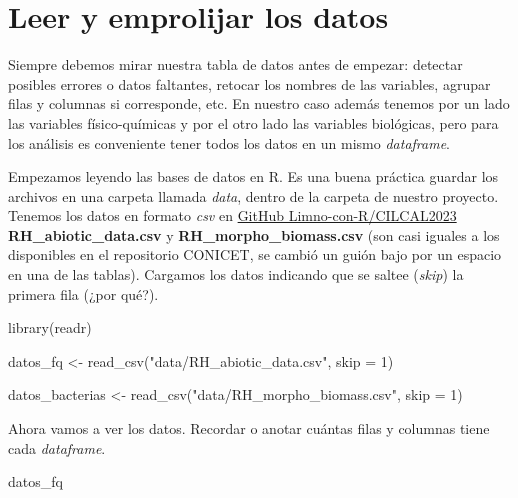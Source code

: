 \documentclass[
]{book}
\newenvironment{Shaded}{\begin{snugshade}}{\end{snugshade}}
\newcommand{\AttributeTok}[1]{\textcolor[rgb]{0.77,0.63,0.00}{#1}}
\newcommand{\DecValTok}[1]{\textcolor[rgb]{0.00,0.00,0.81}{#1}}
\newcommand{\FunctionTok}[1]{\textcolor[rgb]{0.00,0.00,0.00}{#1}}
\newcommand{\NormalTok}[1]{#1}
\newcommand{\OtherTok}[1]{\textcolor[rgb]{0.56,0.35,0.01}{#1}}
\newcommand{\StringTok}[1]{\textcolor[rgb]{0.31,0.60,0.02}{#1}}
\begin{document}
\hypertarget{leer-y-emprolijar-los-datos}{%
\section{Leer y emprolijar los datos}\label{leer-y-emprolijar-los-datos}}

Siempre debemos mirar nuestra tabla de datos antes de empezar: detectar posibles errores o datos faltantes, retocar los nombres de las variables, agrupar filas y columnas si corresponde, etc. En nuestro caso además tenemos por un lado las variables físico-químicas y por el otro lado las variables biológicas, pero para los análisis es conveniente tener todos los datos en un mismo \emph{dataframe}.

Empezamos leyendo las bases de datos en R. Es una buena práctica guardar los archivos en una carpeta llamada \emph{data}, dentro de la carpeta de nuestro proyecto. Tenemos los datos en formato \emph{csv} en \href{https://github.com/Limno-con-R/CILCAL2023/tree/main/datasets}{GitHub Limno-con-R/CILCAL2023} \textbf{RH\_abiotic\_data.csv} y \textbf{RH\_morpho\_biomass.csv} (son casi iguales a los disponibles en el repositorio CONICET, se cambió un guión bajo por un espacio en una de las tablas). Cargamos los datos indicando que se saltee (\emph{skip}) la primera fila (¿por qué?).

\begin{Shaded}
\begin{Highlighting}[]
\FunctionTok{library}\NormalTok{(readr)}

\NormalTok{datos\_fq }\OtherTok{\textless{}{-}} \FunctionTok{read\_csv}\NormalTok{(}\StringTok{"data/RH\_abiotic\_data.csv"}\NormalTok{, }\AttributeTok{skip =} \DecValTok{1}\NormalTok{)}

\NormalTok{datos\_bacterias }\OtherTok{\textless{}{-}} \FunctionTok{read\_csv}\NormalTok{(}\StringTok{"data/RH\_morpho\_biomass.csv"}\NormalTok{, }\AttributeTok{skip =} \DecValTok{1}\NormalTok{)}
\end{Highlighting}
\end{Shaded}

Ahora vamos a ver los datos. Recordar o anotar cuántas filas y columnas tiene cada \emph{dataframe}.

\begin{Shaded}
\begin{Highlighting}[]
\NormalTok{datos\_fq}
\end{Highlighting}
\end{Shaded}
\end{document}

